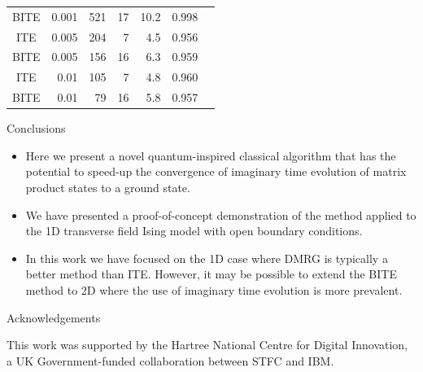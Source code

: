 \documentclass[final,hyperref={pdfpagelabels=false},mathserif]{beamer}
\begin{document}
\begin{columns}[t]
\begin{column}{40cm}
\begin{block}
\begin{table}[h]
\begin{tabular}{crrrrrr}
    BITE & 0.001 & 521 & 17 & 10.2 & 0.998\\

    ITE & 0.005 & 204 & 7 & 4.5 & 0.956 \\

    BITE & 0.005 & 156 & 16 & 6.3 & 0.959 \\

    ITE & 0.01 & 105 & 7  & 4.8 & 0.960 \\

    BITE & 0.01 & 79 & 16 & 5.8 & 0.957 \\
\bottomrule
    \end{tabular}
\end{table}
\end{block}

\begin{block}
{Conclusions}
\begin{itemize}[label=\textbullet, leftmargin=*]
\item Here we present a novel quantum-inspired classical algorithm that has the potential to speed-up the convergence of imaginary time evolution of matrix product states to a ground state.
\item We have presented a proof-of-concept demonstration of the method applied to the 1D transverse field Ising model with open boundary conditions.
\item In this work we have focused on the 1D case where DMRG is typically a better method than ITE. However, it may be possible to extend the BITE method to 2D where the use of imaginary time evolution is more prevalent.
\end{itemize}
\end{block}

\begin{block}
{Acknowledgements}

This work was supported by the Hartree National Centre for Digital Innovation, a UK Government-funded collaboration between STFC and IBM.
\end{block}
\end{column}

\end{columns}

%
\end{document}
